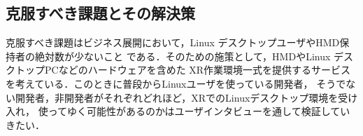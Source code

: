 \subsection{克服すべき課題とその解決策}

克服すべき課題はビジネス展開において，Linux デスクトップユーザやHMD保持者の絶対数が少ないこと
である．そのための施策として，HMDやLinux デスクトップPCなどのハードウェアを含めた
XR作業環境一式を提供するサービスを考えている．このときに普段からLinuxユーザを使っている開発者，
そうでない開発者，非開発者がそれぞれどれほど，XRでのLinuxデスクトップ環境を受け入れ，
使ってゆく可能性があるのかはユーザインタビューを通して検証していきたい．

